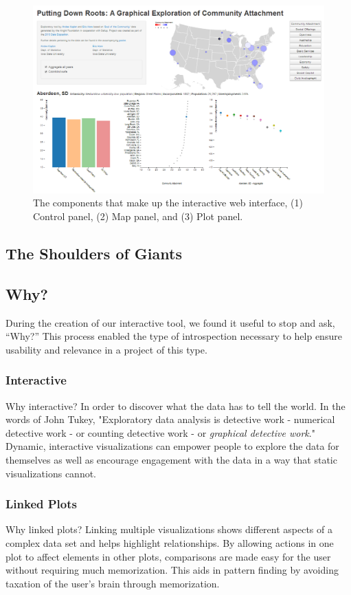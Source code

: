 \documentclass[11pt]{article}\usepackage{knitr}
\begin{document}
\begin{figure}[H]
\centering
\includegraphics[width=\textwidth]{images/tool.png}
\caption{\label{fig:tool} The components that make up the interactive web interface, (1) Control panel, (2) Map panel, and (3) Plot panel.}
\end{figure}



\subsection*{The Shoulders of Giants}

\subsection*{Why?}
During the creation of our interactive tool, we found it useful to stop and ask, ``Why?'' This process enabled the type of introspection necessary to help ensure usability and relevance in a project of this type.

\subsubsection*{Interactive}
Why interactive? In order to discover what the data has to tell the world. In the words of John Tukey, "Exploratory data analysis is detective work - numerical detective work - or counting detective work - or \emph{graphical detective work}." \cite{tukey77} Dynamic, interactive visualizations can empower people to explore the data for themselves as well as encourage engagement with the data in a way that static visualizations cannot.

\subsubsection*{Linked Plots}
Why linked plots? Linking multiple visualizations shows different aspects of a complex data set and helps highlight relationships. By allowing actions in one plot to affect elements in other plots, comparisons are made easy for the user without requiring much memorization. This aids in pattern finding by avoiding taxation of the user's brain through memorization.
\end{document}
